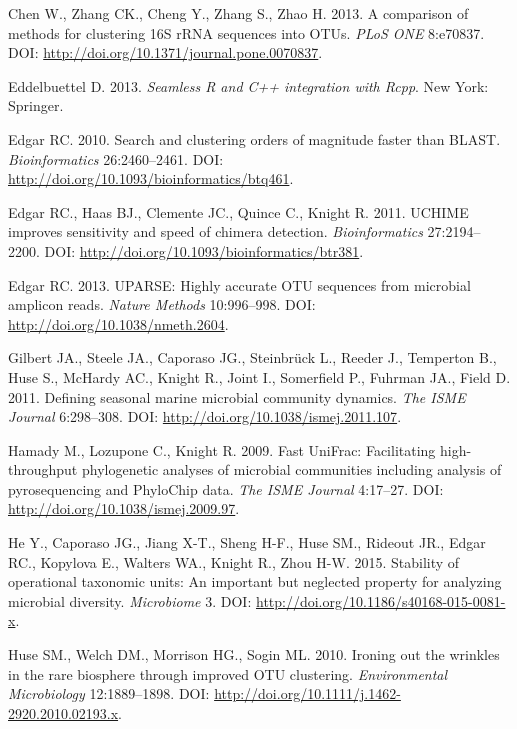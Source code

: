 \documentclass[11pt,]{article}
\begin{document}
Chen W., Zhang CK., Cheng Y., Zhang S., Zhao H. 2013. A comparison of
methods for clustering 16S rRNA sequences into OTUs. \emph{PLoS ONE}
8:e70837. DOI: \url{http://doi.org/10.1371/journal.pone.0070837}.

Eddelbuettel D. 2013. \emph{Seamless R and C++ integration with Rcpp}.
New York: Springer.

Edgar RC. 2010. Search and clustering orders of magnitude faster than
BLAST. \emph{Bioinformatics} 26:2460--2461. DOI:
\url{http://doi.org/10.1093/bioinformatics/btq461}.

Edgar RC., Haas BJ., Clemente JC., Quince C., Knight R. 2011. UCHIME
improves sensitivity and speed of chimera detection.
\emph{Bioinformatics} 27:2194--2200. DOI:
\url{http://doi.org/10.1093/bioinformatics/btr381}.

Edgar RC. 2013. UPARSE: Highly accurate OTU sequences from microbial
amplicon reads. \emph{Nature Methods} 10:996--998. DOI:
\url{http://doi.org/10.1038/nmeth.2604}.

Gilbert JA., Steele JA., Caporaso JG., Steinbrück L., Reeder J.,
Temperton B., Huse S., McHardy AC., Knight R., Joint I., Somerfield P.,
Fuhrman JA., Field D. 2011. Defining seasonal marine microbial community
dynamics. \emph{The ISME Journal} 6:298--308. DOI:
\url{http://doi.org/10.1038/ismej.2011.107}.

Hamady M., Lozupone C., Knight R. 2009. Fast UniFrac: Facilitating
high-throughput phylogenetic analyses of microbial communities including
analysis of pyrosequencing and PhyloChip data. \emph{The ISME Journal}
4:17--27. DOI: \url{http://doi.org/10.1038/ismej.2009.97}.

He Y., Caporaso JG., Jiang X-T., Sheng H-F., Huse SM., Rideout JR.,
Edgar RC., Kopylova E., Walters WA., Knight R., Zhou H-W. 2015.
Stability of operational taxonomic units: An important but neglected
property for analyzing microbial diversity. \emph{Microbiome} 3. DOI:
\url{http://doi.org/10.1186/s40168-015-0081-x}.

Huse SM., Welch DM., Morrison HG., Sogin ML. 2010. Ironing out the
wrinkles in the rare biosphere through improved OTU clustering.
\emph{Environmental Microbiology} 12:1889--1898. DOI:
\url{http://doi.org/10.1111/j.1462-2920.2010.02193.x}.
\end{document}
